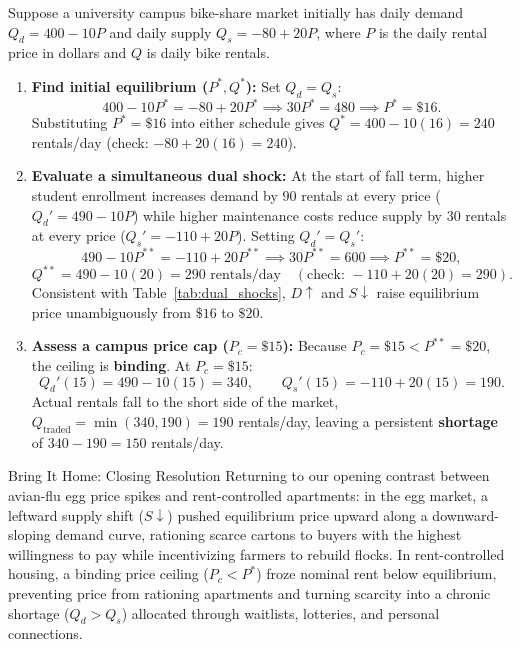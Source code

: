 \documentclass[11pt,letterpaper]{article}
\begin{document}
\begin{coreprinciple}
Suppose a university campus bike-share market initially has daily demand $Q_d = 400 - 10P$ and daily supply $Q_s = -80 + 20P$, where $P$ is the daily rental price in dollars and $Q$ is daily bike rentals.
\begin{enumerate}
  \item \textbf{Find initial equilibrium ($P^*, Q^*$):} Set $Q_d = Q_s$:
  $$400 - 10P^* = -80 + 20P^* \implies 30P^* = 480 \implies P^* = \$16.$$
  Substituting $P^* = \$16$ into either schedule gives $Q^* = 400 - 10(16) = 240$ rentals/day (check: $-80 + 20(16) = 240$).
  \item \textbf{Evaluate a simultaneous dual shock:} At the start of fall term, higher student enrollment increases demand by $90$ rentals at every price ($Q_d' = 490 - 10P$) while higher maintenance costs reduce supply by $30$ rentals at every price ($Q_s' = -110 + 20P$). Setting $Q_d' = Q_s'$:
  $$490 - 10P^{**} = -110 + 20P^{**} \implies 30P^{**} = 600 \implies P^{**} = \$20,$$
  $$Q^{**} = 490 - 10(20) = 290 \text{ rentals/day} \quad (\text{check: } -110 + 20(20) = 290).$$
  Consistent with Table~\ref{tab:dual_shocks}, $D \uparrow$ and $S \downarrow$ raise equilibrium price unambiguously from $\$16$ to $\$20$.
  \item \textbf{Assess a campus price cap ($P_c = \$15$):} Because $P_c = \$15 < P^{**} = \$20$, the ceiling is \textbf{binding}. At $P_c = \$15$:
  $$Q_d'(15) = 490 - 10(15) = 340, \qquad Q_s'(15) = -110 + 20(15) = 190.$$
  Actual rentals fall to the short side of the market, $Q_{\text{traded}} = \min(340, 190) = 190$ rentals/day, leaving a persistent \textbf{shortage} of $340 - 190 = 150$ rentals/day.
\end{enumerate}
\end{coreprinciple}

\begin{examplecase}{Bring It Home: Closing Resolution}
Returning to our opening contrast between avian-flu egg price spikes and rent-controlled apartments: in the egg market, a leftward supply shift ($S \downarrow$) pushed equilibrium price upward along a downward-sloping demand curve, rationing scarce cartons to buyers with the highest willingness to pay while incentivizing farmers to rebuild flocks. In rent-controlled housing, a binding price ceiling ($P_c < P^*$) froze nominal rent below equilibrium, preventing price from rationing apartments and turning scarcity into a chronic shortage ($Q_d > Q_s$) allocated through waitlists, lotteries, and personal connections.
\end{examplecase}
\end{document}

